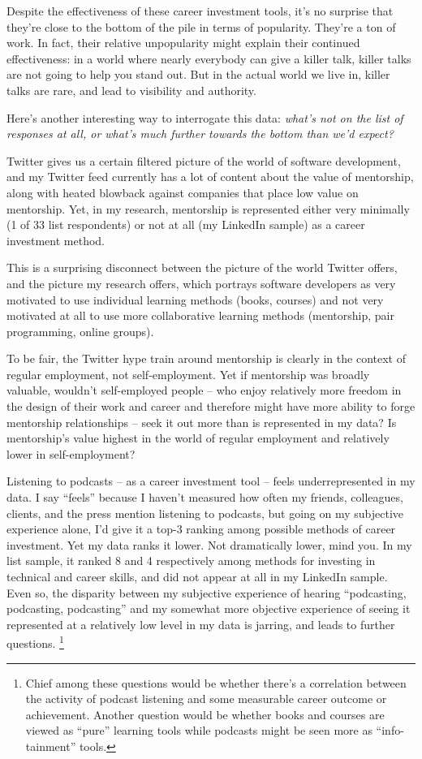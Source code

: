 \documentclass[13pt,]{tufte-handout}
\begin{document}
Despite the effectiveness of these career investment tools, it's no
surprise that they're close to the bottom of the pile in terms of
popularity. They're a ton of work. In fact, their relative unpopularity
might explain their continued effectiveness: in a world where nearly
everybody can give a killer talk, killer talks are not going to help you
stand out. But in the actual world we live in, killer talks are rare,
and lead to visibility and authority.

Here's another interesting way to interrogate this data: \emph{what's
not on the list of responses at all, or what's much further towards the
bottom than we'd expect?}

Twitter gives us a certain filtered picture of the world of software
development, and my Twitter feed currently has a lot of content about
the value of mentorship, along with heated blowback against companies
that place low value on mentorship. Yet, in my research, mentorship is
represented either very minimally (1 of 33 list respondents) or not at
all (my LinkedIn sample) as a career investment method.

This is a surprising disconnect between the picture of the world Twitter
offers, and the picture my research offers, which portrays software
developers as very motivated to use individual learning methods (books,
courses) and not very motivated at all to use more collaborative
learning methods (mentorship, pair programming, online groups).

To be fair, the Twitter hype train around mentorship is clearly in the
context of regular employment, not self-employment. Yet if mentorship
was broadly valuable, wouldn't self-employed people -- who enjoy
relatively more freedom in the design of their work and career and
therefore might have more ability to forge mentorship relationships --
seek it out more than is represented in my data? Is mentorship's value
highest in the world of regular employment and relatively lower in
self-employment?

Listening to podcasts -- as a career investment tool -- feels
underrepresented in my data. I say ``feels'' because I haven't measured
how often my friends, colleagues, clients, and the press mention
listening to podcasts, but going on my subjective experience alone, I'd
give it a top-3 ranking among possible methods of career investment. Yet
my data ranks it lower. Not dramatically lower, mind you. In my list
sample, it ranked 8 and 4 respectively among methods for investing in
technical and career skills, and did not appear at all in my LinkedIn
sample. Even so, the disparity between my subjective experience of
hearing ``podcasting, podcasting, podcasting'' and my somewhat more
objective experience of seeing it represented at a relatively low level
in my data is jarring, and leads to further questions. \footnote{Chief
  among these questions would be whether there's a correlation between
  the activity of podcast listening and some measurable career outcome
  or achievement. Another question would be whether books and courses
  are viewed as ``pure'' learning tools while podcasts might be seen
  more as ``info-tainment'' tools.}
\end{document}

